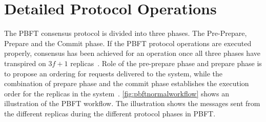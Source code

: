 

\section{Detailed Protocol Operations}
\label{sec:detailedProtocol}
The PBFT consensus protocol is divided into three phases. The Pre-Prepare, Prepare and the Commit phase. If the PBFT protocol operations are executed properly, consensus has been achieved for an operation once all three phases have transpired on $3f+1$ replicas~\cite[p.~257-259]{BOOK:BuildDepDistSyst}. Role of the pre-prepare phase and prepare phase is to propose an ordering for requests delivered to the system, while the combination of prepare phase and the commit phase establishes the execution order for the replicas in the system~\cite[p.~4]{PAPER:OGPBFT}. \autoref{fig:pbftnormalworkflow} shows an illustration of the PBFT workflow. The illustration shows the messages sent from the different replicas during the different protocol phases in PBFT.

